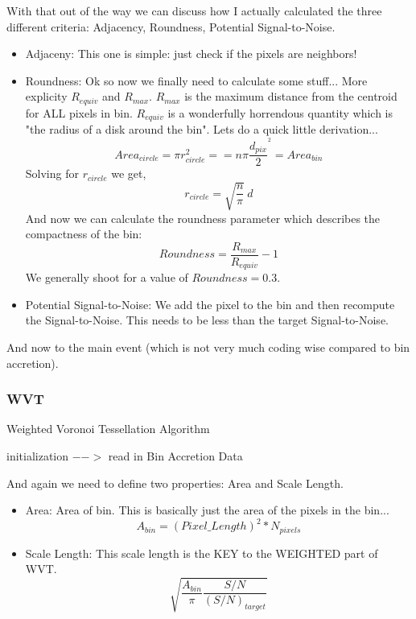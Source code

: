 \documentclass[11pt,letterpaper]{article}
\begin{document}
With that out of the way we can discuss how I actually calculated the three different criteria: Adjacency, Roundness, Potential Signal-to-Noise.

\begin{itemize}
	\item Adjaceny: This one is simple: just check if the pixels are neighbors!
	\item Roundness: Ok so now we finally need to calculate some stuff... More explicity $R_{equiv}$ and $R_{max}$. $R_{max}$ is the maximum distance from the centroid for ALL pixels in bin. $R_{equiv}$ is a wonderfully horrendous quantity which is "the radius of a disk around the bin". Lets do a quick little derivation...
	\begin{equation}
		Area_{circle} = \pi r_{circle}^2 == n\pi\frac{d_{pix}}{2}^^2 = Area_{bin}
	\end{equation} 
	Solving for $r_{circle}$ we get,
	\begin{equation}
		r_{circle} = \sqrt{\frac{n}{\pi}} \ d
	\end{equation}
	And now we can calculate the roundness parameter which describes the compactness of the bin:
	\begin{equation}
		Roundness = \frac{R_{max}}{R_{equiv}} - 1
	\end{equation}
	We generally shoot for a value of $Roundness = 0.3$.
	\item Potential Signal-to-Noise: We add the pixel to the bin and then recompute the Signal-to-Noise. This needs to be less than the target Signal-to-Noise.
\end{itemize}

And now to the main event (which is not very much coding wise compared to bin accretion).

\subsubsection{WVT}
\begin{algorithm}[H]\label{algo:BA}
	\caption{Weighted Voronoi Tessellation Algorithm}
	initialization $-->$ read in Bin Accretion Data\;
\end{algorithm}
And again we need to define two properties: Area and Scale Length.
\begin{itemize}
	\item Area: Area of bin. This is basically just the area of the pixels in the bin...
	\begin{equation}
		A_{bin} = (Pixel\_Length)^2*N_{pixels} 
	\end{equation}
	\item Scale Length: This scale length is the KEY to the WEIGHTED part of WVT.
	\begin{equation}
		\sqrt{\frac{A_{bin}}{\pi}\frac{S/N}{(S/N)_{target}}}
	\end{equation}
\end{itemize}
\end{document}
